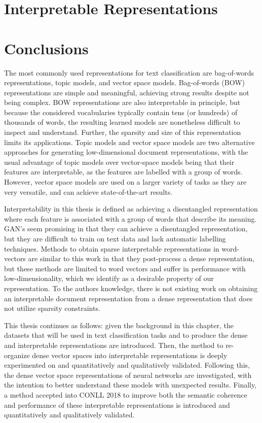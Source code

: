 \section{Interpretable Representations}\label{ch2:Interpretability}


\section{Conclusions}

The most commonly used representations for text classification are bag-of-words representations, topic models, and vector space models. Bag-of-words (BOW) representations are simple and meaningful, achieving strong results despite not being complex. BOW representations are also interpretable in principle, but because the considered vocabularies typically contain tens (or hundreds) of thousands of words, the resulting learned models are nonetheless difficult to inspect and understand. Further, the sparsity and size of this representation limits its applications. Topic models and vector space models are two alternative approaches for generating low-dimensional document representations, with the usual advantage of topic models over vector-space models being that their features are interpretable, as the features are labelled with a group of words. However, vector space models are used on a larger variety of tasks as they are very versatile, and can achieve state-of-the-art results. %

Interpretability in this thesis is defined as achieving a disentangled representation where each feature is associated with a group of words that describe its meaning. GAN's seem promising in that they can achieve a disentangled representation, but they are difficult to train on text data and lack automatic labelling techniques. Methods to obtain sparse interpretable representations in word-vectors are similar to this work in that they post-process a dense representation, but these methods are limited to word vectors and suffer in performance with low-dimensionality, which we identify as a desirable property of our representation. To the authors knowledge, there is not existing work on obtaining an interpretable document representation from a dense representation that does not utilize sparsity constraints.

This thesis continues as follows: given the background in this chapter, the datasets that will be used in text classification tasks and to produce the dense and interpretable representations are introduced. Then, the method to re-organize dense vector spaces into interpretable representations is deeply experimented on and quantitatively and qualitatively validated. Following this, the dense vector space representations of neural networks are investigated, with the intention to better understand these models with unexpected results. Finally, a method accepted into CONLL 2018 to improve both the semantic coherence and performance of these  interpretable representations  is introduced and quantitatively and qualitatively validated. 

